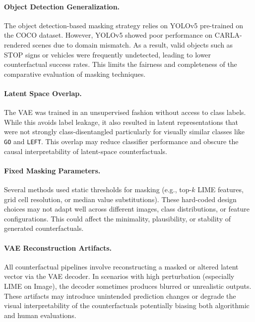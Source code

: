 \vspace{-1em}

\paragraph{Object Detection Generalization.} The object detection-based masking strategy relies on YOLOv5 pre-trained on the COCO dataset. However, YOLOv5 showed poor performance on CARLA-rendered scenes due to domain mismatch. As a result, valid objects such as STOP signs or vehicles were frequently undetected, leading to lower counterfactual success rates. This limits the fairness and completeness of the comparative evaluation of masking techniques.

\vspace{-1em}

\paragraph{Latent Space Overlap.} The VAE was trained in an unsupervised fashion without access to class labels. While this avoids label leakage, it also resulted in latent representations that were not strongly class-disentangled particularly for visually similar classes like \texttt{GO} and \texttt{LEFT}. This overlap may reduce classifier performance and obscure the causal interpretability of latent-space counterfactuals.

\vspace{-1em}

\paragraph{Fixed Masking Parameters.} Several methods used static thresholds for masking (e.g., top-$k$ LIME features, grid cell resolution, or median value substitutions). These hard-coded design choices may not adapt well across different images, class distributions, or feature configurations. This could affect the minimality, plausibility, or stability of generated counterfactuals.

\vspace{-1em}

\paragraph{VAE Reconstruction Artifacts.} All counterfactual pipelines involve reconstructing a masked or altered latent vector via the VAE decoder. In scenarios with high perturbation (especially LIME on Image), the decoder sometimes produces blurred or unrealistic outputs. These artifacts may introduce unintended prediction changes or degrade the visual interpretability of the counterfactuals potentially biasing both algorithmic and human evaluations.

